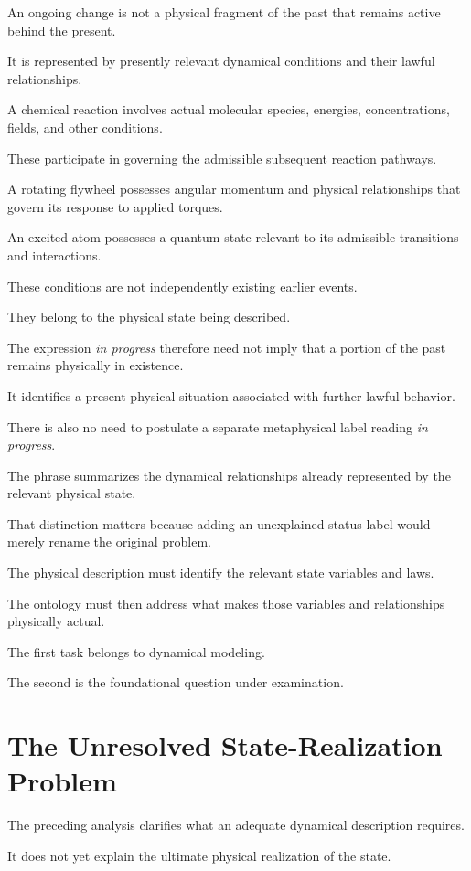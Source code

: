\documentclass[12pt,onecolumn]{article}
\begin{document}
An ongoing change is not a physical fragment of the past that remains active behind the present.

It is represented by presently relevant dynamical conditions and their lawful relationships.

A chemical reaction involves actual molecular species, energies, concentrations, fields, and other conditions.

These participate in governing the admissible subsequent reaction pathways.

A rotating flywheel possesses angular momentum and physical relationships that govern its response to applied torques.

An excited atom possesses a quantum state relevant to its admissible transitions and interactions.

These conditions are not independently existing earlier events.

They belong to the physical state being described.

The expression \emph{in progress} therefore need not imply that a portion of the past remains physically in existence.

It identifies a present physical situation associated with further lawful behavior.

There is also no need to postulate a separate metaphysical label reading \emph{in progress}.

The phrase summarizes the dynamical relationships already represented by the relevant physical state.

That distinction matters because adding an unexplained status label would merely rename the original problem.

The physical description must identify the relevant state variables and laws.

The ontology must then address what makes those variables and relationships physically actual.

The first task belongs to dynamical modeling.

The second is the foundational question under examination.


\section{The Unresolved State-Realization Problem}

The preceding analysis clarifies what an adequate dynamical description requires.

It does not yet explain the ultimate physical realization of the state.
\end{document}
